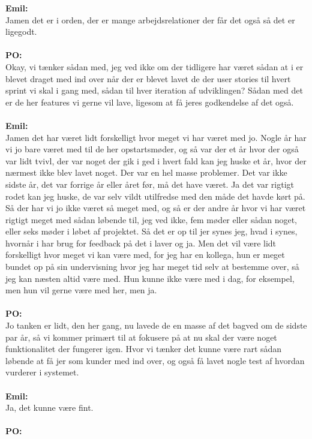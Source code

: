\textbf{Emil:}\\
Jamen det er i orden, der er mange arbejdsrelationer der får det også så det er ligegodt.
\\\\
\textbf{PO:}\\
Okay, vi tænker sådan med, jeg ved ikke om der tidligere har været sådan at i er blevet draget med ind over når der er blevet lavet de der user stories til hvert sprint vi skal i gang med, sådan til hver iteration af udviklingen?
Sådan med det er de her features vi gerne vil lave, ligesom at få jeres godkendelse af det også.
\\\\
\textbf{Emil:}\\
Jamen det har været lidt forskelligt hvor meget vi har været med jo. Nogle år har vi jo bare været med til de her opstartsmøder, og så var der et år hvor der også var lidt tvivl, der var noget der gik i ged i hvert fald kan jeg huske et år, hvor der nærmest ikke blev lavet noget.
Der var en hel masse problemer. 
Det var ikke sidste år, det var forrige år eller året før, må det have været.
Ja det var rigtigt rodet kan jeg huske, de var selv vildt utilfredse med den måde det havde kørt på. 
Så der har vi jo ikke været så meget med, og så er der andre år hvor vi har været rigtigt meget med sådan løbende til, jeg ved ikke, fem møder eller sådan noget, eller seks møder i løbet af projektet.
Så det er op til jer synes jeg, hvad i synes, hvornår i har brug for feedback på det i laver og ja.
Men det vil være lidt forskelligt hvor meget vi kan være med, for jeg har en kollega, hun er meget bundet op på sin undervisning hvor jeg har meget tid selv at bestemme over, så jeg kan næsten altid være med.
Hun kunne ikke være med i dag, for eksempel, men hun vil gerne være med her, men ja. 
\\\\
\textbf{PO:}\\
Jo tanken er lidt, den her gang, nu lavede de en masse af det bagved om de sidste par år, så vi kommer primært til at fokusere på at nu skal der være noget funktionalitet der fungerer igen. 
Hvor vi tænker det kunne være rart sådan løbende at få jer som kunder med ind over, og også få lavet nogle test af hvordan vurderer i systemet.
\\\\
\textbf{Emil:}\\
Ja, det kunne være fint.
\\\\
\textbf{PO:}\\
